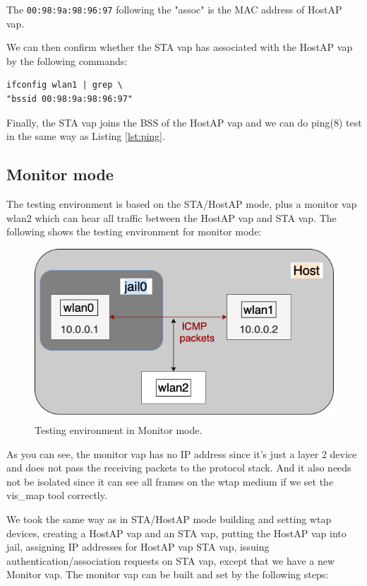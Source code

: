 \documentclass[conference]{IEEEtran}
\begin{document}
The \lstinline{00:98:9a:98:96:97} following the "assoc" is the MAC address of HostAP vap.

We can then confirm whether the STA vap has associated with the HostAP vap by the following commands:

\begin{lstlisting}
ifconfig wlan1 | grep \
"bssid 00:98:9a:98:96:97"
\end{lstlisting}

Finally, the STA vap joins the BSS of the HostAP vap and we can do ping(8) test in the same way as Listing \ref{lst:ping}.

\subsection{Monitor mode}
The testing environment is based on the STA/HostAP mode, plus a monitor vap wlan2 which can hear all traffic between the HostAP vap and STA vap. The following shows the testing environment for monitor mode:

\begin{figure}[H]
\includegraphics[scale=0.40]{ping_monitor.png}
\caption{Testing environment in Monitor mode.}
\label{fig:monitor}
\end{figure}

As you can see, the monitor vap has no IP address since it's just a layer 2 device and does not pass the receiving packets to the protocol stack. And it also needs not be isolated since it can see all frames on the wtap medium if we set the vis\_map tool correctly.

We took the same way as in STA/HostAP mode building and setting wtap devices, creating a HostAP vap and an STA vap, putting the HostAP vap into jail, assigning IP addresses for HostAP vap STA vap, issuing authentication/association requests on STA vap, except that we have a new Monitor vap. The monitor vap can be built and set by the following steps:
\end{document}
